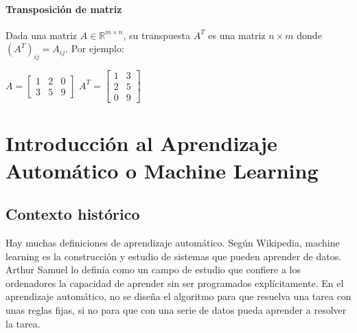 \paragraph{Transposición de matriz} Dada una matriz $A \in \mathbb{R}^{m \times n}$, su transpuesta $A^T$ es una matriz $n \times m$ donde $(A^T)_{ij} = A_{ij}$. Por ejemplo:
\begin{table}[h]
\centering
$A = \begin{bmatrix}
1 & 2 & 0 \\ 3 & 5 & 9
\end{bmatrix}$
\qquad \qquad \qquad
$A^T = \begin{bmatrix}
1 & 3 \\ 2 & 5 \\ 0 & 9
\end{bmatrix} $
\end{table}

\section{Introducción al Aprendizaje Automático o Machine Learning}
\subsection{Contexto histórico}
Hay muchas definiciones de aprendizaje automático. Según Wikipedia, machine learning es la construcción y estudio de sistemas que pueden aprender de datos. Arthur Samuel lo definía como un campo de estudio que confiere a los ordenadores la capacidad de aprender sin ser programados explícitamente. En el aprendizaje automático, no se diseña el algoritmo para que resuelva una tarea con unas reglas fijas, si no para que con una serie de datos pueda aprender a resolver la tarea. 

